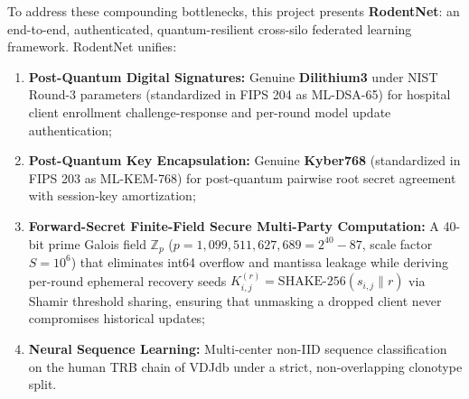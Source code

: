 \documentclass[11pt,a4paper]{report}
\begin{document}
To address these compounding bottlenecks, this project presents \textbf{RodentNet}: an end-to-end, authenticated, quantum-resilient cross-silo federated learning framework. RodentNet unifies:
\begin{enumerate}[itemsep=2pt]
  \item \textbf{Post-Quantum Digital Signatures:} Genuine \textbf{Dilithium3} under NIST Round-3 parameters (standardized in FIPS 204 as ML-DSA-65) for hospital client enrollment challenge-response and per-round model update authentication;
  \item \textbf{Post-Quantum Key Encapsulation:} Genuine \textbf{Kyber768} (standardized in FIPS 203 as ML-KEM-768) for post-quantum pairwise root secret agreement with session-key amortization;
  \item \textbf{Forward-Secret Finite-Field Secure Multi-Party Computation:} A 40-bit prime Galois field $\mathbb{Z}_p$ ($p = 1{,}099{,}511{,}627{,}689 = 2^{40}-87$, scale factor $S = 10^6$) that eliminates int64 overflow and mantissa leakage while deriving per-round ephemeral recovery seeds $K_{i,j}^{(r)} = \text{SHAKE-256}(s_{i,j} \parallel r)$ via Shamir threshold sharing, ensuring that unmasking a dropped client never compromises historical updates;
  \item \textbf{Neural Sequence Learning:} Multi-center non-IID sequence classification on the human TRB chain of VDJdb under a strict, non-overlapping clonotype split.
\end{enumerate}
\end{document}
